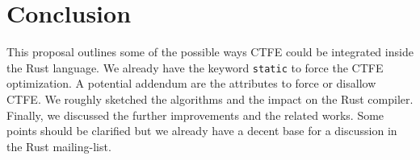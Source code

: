 \documentclass[a4paper,11pt]{article}
\begin{document}
\section{Conclusion}

This proposal outlines some of the possible ways CTFE could be integrated inside the Rust language. We already have the keyword \lstinline{static} to force the CTFE optimization. A potential addendum are the attributes to force or disallow CTFE. We roughly sketched the algorithms and the impact on the Rust compiler. Finally, we discussed the further improvements and the related works. Some points should be clarified but we already have a decent base for a discussion in the Rust mailing-list.

\newpage
{}

\end{document}
